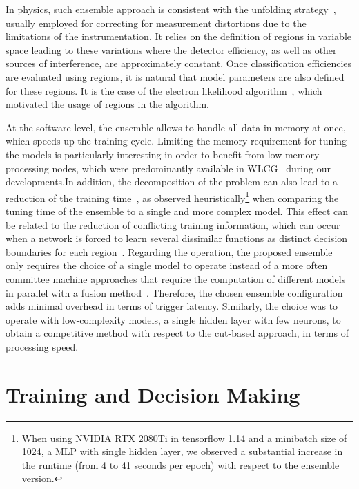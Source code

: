 In physics, such ensemble approach is consistent with the unfolding
strategy~\cite{unfolding_book}, usually employed for correcting for
measurement distortions due to the limitations of the instrumentation. It relies
on the definition of regions in variable space leading to these
variations where the detector efficiency, as well as other
sources of interference, are approximately constant. Once classification
efficiencies are evaluated using regions, it is natural that model parameters
are also defined for these regions. It is the case of the electron likelihood
algorithm~\cite{atlas_electron_id_offline}, which motivated the usage of
\eteta{} regions in the \rnn{} algorithm.

At the software level, the ensemble allows to handle all data in memory at once,
which speeds up the training cycle. Limiting the memory requirement for tuning
the models is particularly interesting in order to benefit from low-memory 
 processing nodes, which were predominantly available in 
WLCG~\cite{2015_lcg_tdr} during our
developments.\@ In addition, the decomposition of the problem can also lead to a
reduction of the training time~\cite{Polikar2006}, as observed heuristically\footnote{
  When using NVIDIA RTX 2080Ti in tensorflow 1.14 and a minibatch size of 1024, a 
  MLP with single hidden layer, we observed a substantial increase in the runtime (from 4 
  to 41 seconds per epoch) with respect to the ensemble version.} when
comparing the tuning time of the ensemble to a single and more complex model.
This effect can be related to the reduction of conflicting training information,
which can occur when a network is forced to learn several dissimilar functions
as distinct decision boundaries for each region~\cite{Auda1999,haykin_2008}.
Regarding the operation, the proposed ensemble only requires the choice of a
single model to operate instead of a more often committee machine approaches
that require the computation of different models in parallel with a fusion
method~\cite{zhou_ensemble}.  Therefore, the chosen ensemble configuration adds
minimal overhead in terms of trigger latency. Similarly, the choice was to
operate with low-complexity models, a single hidden layer with few neurons, to obtain a competitive method with respect to the cut-based
approach, in terms of processing speed.



\section{Training and Decision Making}%
\label{sec:tuning}

